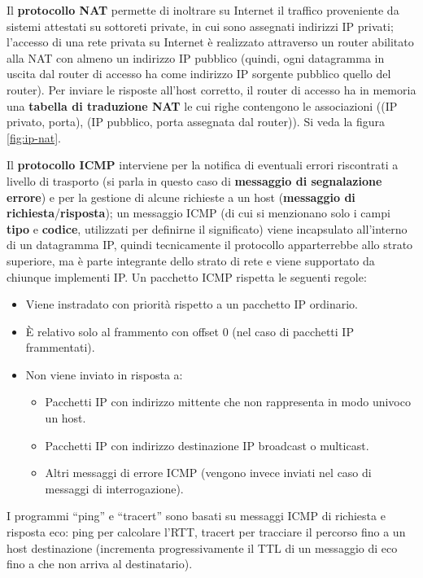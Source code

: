 \documentclass[11pt, italian, openany]{book}
\begin{document}
\begin{sloppypar}
{} \label{Protocollo NAT}
Il \textbf{protocollo NAT} permette di inoltrare su Internet il traffico proveniente da sistemi attestati su sottoreti private, in cui sono assegnati indirizzi IP
privati; l'accesso di una rete privata su Internet \`e realizzato attraverso un router abilitato alla NAT con almeno un indirizzo IP pubblico (quindi, ogni
datagramma in uscita dal router di accesso ha come indirizzo IP sorgente pubblico quello del router). Per inviare le risposte all'host corretto, il router
di accesso ha in memoria una \textbf{tabella di traduzione NAT} le cui righe contengono le associazioni ((IP privato, porta), (IP pubblico, porta assegnata
dal router)). Si veda la figura \ref{fig:ip-nat}.

{} \label{Protocollo ICMP}
Il \textbf{protocollo ICMP} interviene per la notifica di eventuali errori riscontrati a livello di trasporto (si parla in questo caso di
\textbf{messaggio di segnalazione errore}) e per la gestione di alcune richieste a un host (\textbf{messaggio di richiesta}/\textbf{risposta}); un messaggio
ICMP (di cui si menzionano solo i campi \textbf{tipo} e \textbf{codice}, utilizzati per definirne il significato) viene incapsulato all'interno di un
datagramma IP, quindi tecnicamente il protocollo apparterrebbe allo strato superiore, ma \`e parte integrante dello strato di rete e viene supportato da
chiunque implementi IP. Un pacchetto ICMP rispetta le seguenti regole:
\begin{itemize}[itemsep=0pt, parsep=0pt, topsep=0pt]
	\item Viene instradato con priorit\`a rispetto a un pacchetto IP ordinario.
	\item \`E relativo solo al frammento con offset 0 (nel caso di pacchetti IP frammentati).
	\item Non viene inviato in risposta a:
	\begin{itemize}
		\item Pacchetti IP con indirizzo mittente che non rappresenta in modo univoco un host.
		\item Pacchetti IP con indirizzo destinazione IP broadcast o multicast.
		\item Altri messaggi di errore ICMP (vengono invece inviati nel caso di messaggi di interrogazione).
	\end{itemize}
\end{itemize}
I programmi ``ping'' e ``tracert'' sono basati su messaggi ICMP di richiesta e risposta eco: ping per calcolare l'RTT, tracert per tracciare il percorso
fino a un host destinazione (incrementa progressivamente il TTL di un messaggio di eco fino a che non arriva al destinatario).


\end{sloppypar}
\end{document}
